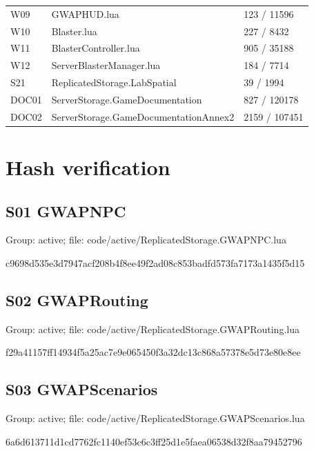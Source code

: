 \begin{longtable}{p{}p{}p{}}
W09 & GWAPHUD.\allowbreak{}lua & 123 /\allowbreak{} 11596 \\
W10 & Blaster.\allowbreak{}lua & 227 /\allowbreak{} 8432 \\
W11 & BlasterController.\allowbreak{}lua & 905 /\allowbreak{} 35188 \\
W12 & ServerBlasterManager.\allowbreak{}lua & 184 /\allowbreak{} 7714 \\
S21 & ReplicatedStorage.\allowbreak{}LabSpatial & 39 /\allowbreak{} 1994 \\
DOC01 & ServerStorage.\allowbreak{}GameDocumentation & 827 /\allowbreak{} 120178 \\
DOC02 & ServerStorage.\allowbreak{}GameDocumentationAnnex2 & 2159 /\allowbreak{} 107451 \\
\bottomrule
\end{longtable}
\section{Hash verification}
\subsection{S01 GWAPNPC}
Group: active; file: code/\allowbreak{}active/\allowbreak{}ReplicatedStorage.\allowbreak{}GWAPNPC.\allowbreak{}lua

\begin{flushleft}\ttfamily\footnotesize c9698d535e3d7947acf208b4f8ee49f2ad08c853badfd573fa7173a1435f5d15\end{flushleft}
\subsection{S02 GWAPRouting}
Group: active; file: code/\allowbreak{}active/\allowbreak{}ReplicatedStorage.\allowbreak{}GWAPRouting.\allowbreak{}lua

\begin{flushleft}\ttfamily\footnotesize f29a41157ff14934f5a25ac7e9e065450f3a32dc13c868a57378e5d73e80e8ee\end{flushleft}
\subsection{S03 GWAPScenarios}
Group: active; file: code/\allowbreak{}active/\allowbreak{}ReplicatedStorage.\allowbreak{}GWAPScenarios.\allowbreak{}lua

\begin{flushleft}\ttfamily\footnotesize 6a6d613711d1cd7762fc1140ef53c6c3ff25d1e5faea06538d32f8aa79452796\end{flushleft}
